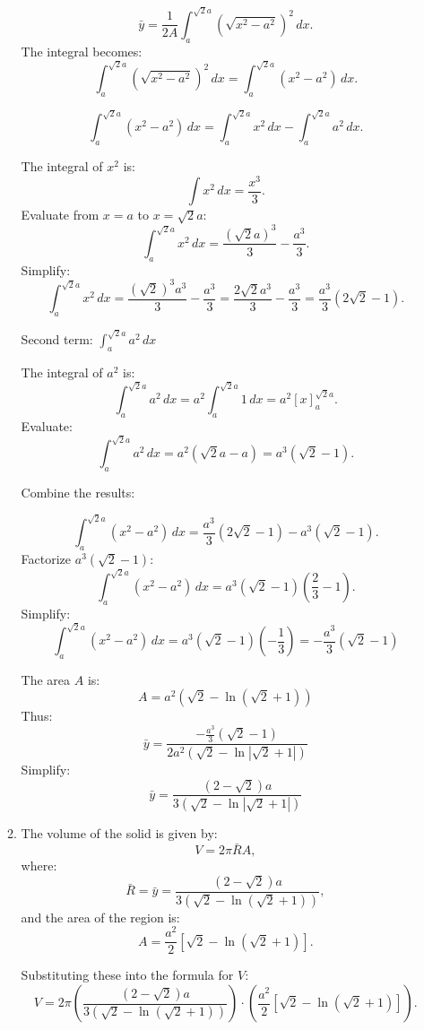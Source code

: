 \documentclass[12pt]{article}
\begin{document}
\begin{enumerate}
\begin{enumerate}
\[
\bar{y} = \frac{1}{2A} \int_a^{\sqrt{2}a} \left( \sqrt{x^2 - a^2} \right)^2 \, dx.
\]
The integral becomes:
\[
\int_a^{\sqrt{2}a} \left( \sqrt{x^2 - a^2} \right)^2 \, dx = \int_a^{\sqrt{2}a} \left( x^2 - a^2 \right) \, dx.
\]

\[
\int_a^{\sqrt{2}a} \left( x^2 - a^2 \right) \, dx = \int_a^{\sqrt{2}a} x^2 \, dx - \int_a^{\sqrt{2}a} a^2 \, dx.
\]

The integral of \( x^2 \) is:
\[
\int x^2 \, dx = \frac{x^3}{3}.
\]
Evaluate from \( x = a \) to \( x = \sqrt{2}a \):
\[
\int_a^{\sqrt{2}a} x^2 \, dx = \frac{(\sqrt{2}a)^3}{3} - \frac{a^3}{3}.
\]
Simplify:
\[
\int_a^{\sqrt{2}a} x^2 \, dx = \frac{(\sqrt{2})^3 a^3}{3} - \frac{a^3}{3} = \frac{2\sqrt{2}a^3}{3} - \frac{a^3}{3} = \frac{a^3}{3}(2\sqrt{2} - 1).
\]

Second term: \( \int_a^{\sqrt{2}a} a^2 \, dx \)

The integral of \( a^2 \) is:
\[
\int_a^{\sqrt{2}a} a^2 \, dx = a^2 \int_a^{\sqrt{2}a} 1 \, dx = a^2 \left[ x \right]_a^{\sqrt{2}a}.
\]
Evaluate:
\[
\int_a^{\sqrt{2}a} a^2 \, dx = a^2 \left( \sqrt{2}a - a \right) = a^3 (\sqrt{2} - 1).
\]

Combine the results:

\[
\int_a^{\sqrt{2}a} \left( x^2 - a^2 \right) \, dx = \frac{a^3}{3}(2\sqrt{2} - 1) - a^3 (\sqrt{2} - 1).
\]
Factorize \( a^3 (\sqrt{2} - 1) \):
\[
\int_a^{\sqrt{2}a} \left( x^2 - a^2 \right) \, dx = a^3 (\sqrt{2} - 1) \left( \frac{2}{3} - 1 \right).
\]
Simplify:
\[
\int_a^{\sqrt{2}a} \left( x^2 - a^2 \right) \, dx = a^3 (\sqrt{2} - 1) \left( -\frac{1}{3} \right) = -\frac{a^3}{3} (\sqrt{2} - 1)
\]


The area \( A \) is:
\[
A = a^2 \left( \sqrt{2} - \ln(\sqrt{2} + 1) \right)
\]
Thus:
\[
\bar{y} = \frac{-\frac{a^3}{3} (\sqrt{2} - 1)}{2a^2 \left( \sqrt{2} - \ln|\sqrt{2} + 1| \right)}
\]
Simplify:
\[
\bar{y} = \frac{(2 - \sqrt{2})a}{3 \left( \sqrt{2} - \ln|\sqrt{2} + 1| \right) }
\]
\item 
The volume of the solid is given by:
\[
V = 2 \pi \bar{R} A,
\]
where:
\[
\bar{R} = \bar{y} = \frac{(2 - \sqrt{2})a}{3 \left( \sqrt{2} - \ln(\sqrt{2} + 1) \right)},
\]
and the area of the region is:
\[
A = \frac{a^2}{2} \left[ \sqrt{2} - \ln(\sqrt{2} + 1) \right].
\]

Substituting these into the formula for \(V\):
\[
V = 2 \pi \left( \frac{(2 - \sqrt{2})a}{3 \left( \sqrt{2} - \ln(\sqrt{2} + 1) \right)} \right) \cdot \left( \frac{a^2}{2} \left[ \sqrt{2} - \ln(\sqrt{2} + 1) \right] \right).
\]


\end{enumerate}
\end{enumerate}
\end{document}

